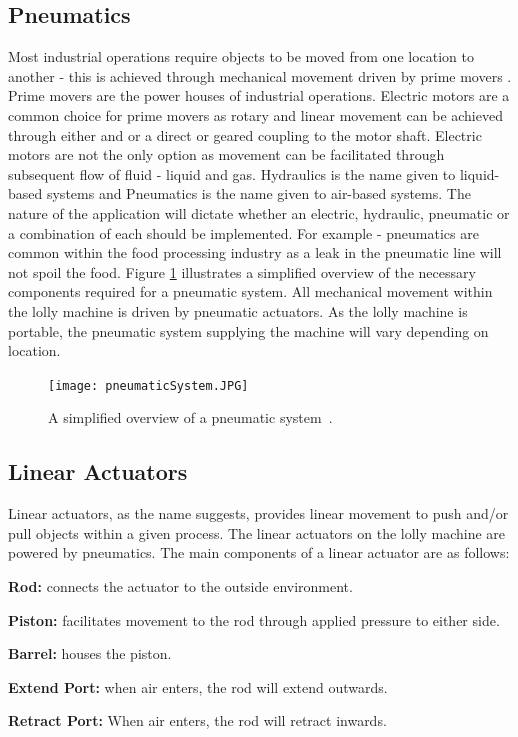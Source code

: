 \subsection{Pneumatics}

    Most industrial operations require objects to be moved from one location to another - this is achieved through mechanical movement driven by prime movers \cite{parr2011hydraulics}. Prime movers are the power houses of industrial operations. Electric motors are a common choice for prime movers as rotary and linear movement can be achieved through either and or a direct or geared coupling to the motor shaft\cite{parr2011hydraulics}. Electric motors are not the only option as movement can be facilitated through subsequent flow of fluid - liquid and gas\cite{parr2011hydraulics}. Hydraulics is the name given to liquid-based systems and Pneumatics is the name given to air-based systems. The nature of the application will dictate whether an electric, hydraulic, pneumatic or a combination of each should be implemented. For example - pneumatics are common within the food processing industry as a leak in the pneumatic line will not spoil the food. Figure \ref{fig:pnemumaticSystem} illustrates a simplified overview of the necessary components required for a pneumatic system. 
    All mechanical movement within the lolly machine is driven by pneumatic actuators. As the lolly machine is portable, the pneumatic system supplying the machine will vary depending on location.
    
    \begin{figure}[H]
        \centering
        \texttt{[image: pneumaticSystem.JPG]}
        \caption{A simplified overview of a pneumatic system~\cite{parr2011hydraulics}.}
        \label{fig:pnemumaticSystem}
    \end{figure}
    \newpage
    
\subsection{Linear Actuators}
    Linear actuators, as the name suggests, provides linear movement to push and/or pull objects within a given process. The linear actuators on the lolly machine are powered by pneumatics. The main components of a linear actuator are as follows:
    
    \begin{description} 
        \item\textbf{Rod:} connects the actuator to the outside environment.
        \item\textbf{Piston:} facilitates movement to the rod through applied pressure to either side.
        \item\textbf{Barrel:} houses the piston.
        \item\textbf{Extend Port:} when air enters, the rod will extend outwards.
        \item\textbf{Retract Port:} When air enters, the rod will retract inwards.
    \end{description}
    
